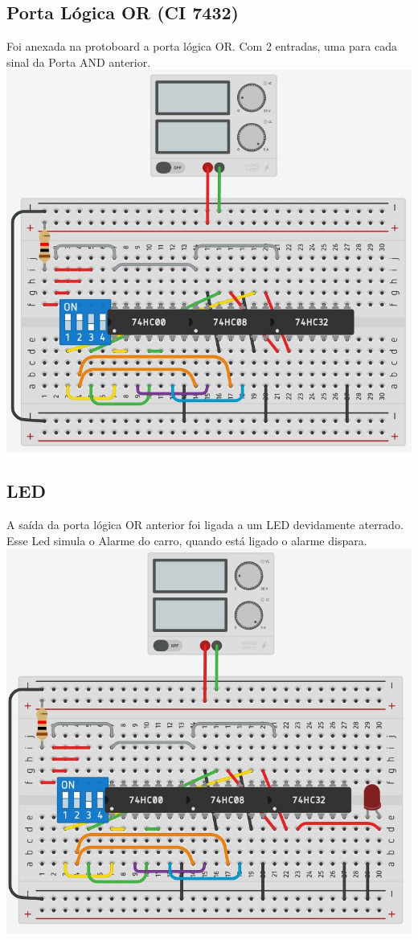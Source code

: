\documentclass[]{article}
\begin{document}
		\subsection{Porta Lógica OR (CI 7432)}
			Foi anexada na protoboard a porta lógica OR. Com 2 entradas, uma para cada sinal da Porta AND anterior.\\
			\includegraphics[scale=0.5]{Images/Tinkercad 05.jpg} \\
		\subsection{LED}
			A saída da porta lógica OR anterior foi ligada a um LED devidamente aterrado. Esse Led simula o Alarme do carro, quando está ligado o alarme dispara. \\
			\includegraphics[scale=0.5]{Images/Tinkercad 06.jpg} \\
\end{document}
